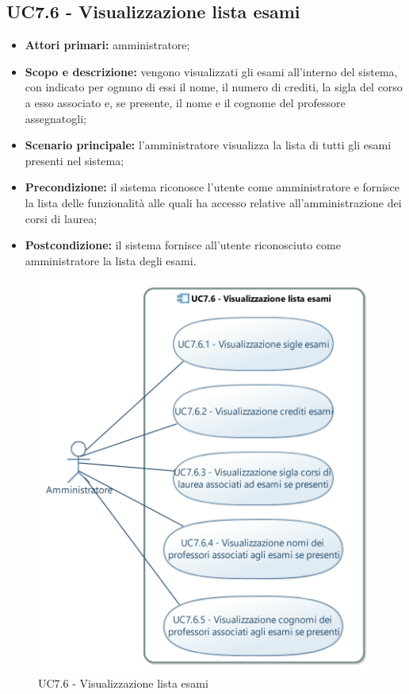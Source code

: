 \documentclass[AnalisiDeiRequisiti.tex]{subfiles}
\begin{document}
\subsection{UC7.6 - Visualizzazione lista esami}
\begin{itemize}
	\item \textbf{Attori primari:} amministratore;
	\item \textbf{Scopo e descrizione:} vengono visualizzati gli esami all'interno del sistema, con indicato per ognuno di essi il nome, il numero di crediti, la sigla del corso a esso associato e, se presente, il nome e il cognome del professore assegnatogli;
	\item \textbf{Scenario principale:} l'amministratore visualizza la lista di tutti gli esami presenti nel sistema;
	\item \textbf{Precondizione:} il sistema riconosce l'utente come amministratore e fornisce la lista delle funzionalità alle quali ha accesso relative all'amministrazione dei corsi di laurea;
	\item \textbf{Postcondizione:} il sistema fornisce all'utente riconosciuto come amministratore la lista degli esami.
\end{itemize}
\begin{figure}[H]
	\centering
	\includegraphics[width=0.7\linewidth]{UC7_6.jpg}
	\caption{UC7.6 - Visualizzazione lista esami}
	\label{fig:UC7.6 - Visualizzazione lista esami}
\end{figure}
\end{document}
